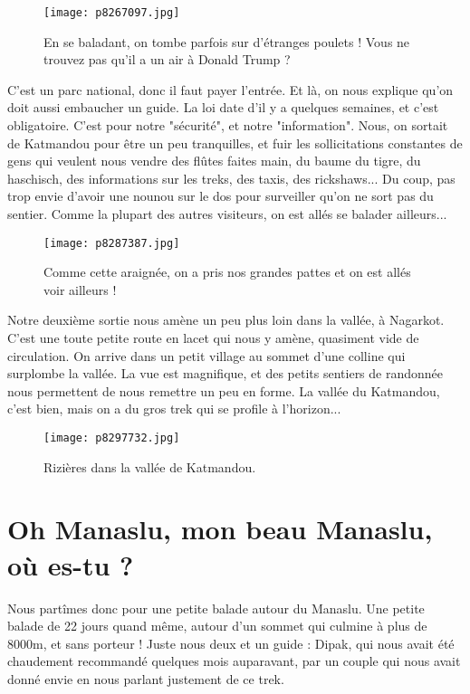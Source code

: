 \documentclass{book}
\begin{document}
\begin{figure}[h]
\centering
\texttt{[image: p8267097.jpg]}
\caption*{En se baladant, on tombe parfois sur d'étranges poulets ! Vous ne trouvez pas qu'il a un air à Donald Trump ?}
\end{figure}

C'est un parc national, donc il faut payer l'entrée. Et là, on nous explique qu'on doit aussi embaucher un guide. La loi date d'il y a quelques semaines, et c'est obligatoire. C'est pour notre "sécurité", et notre "information". Nous, on sortait de Katmandou pour être un peu tranquilles, et fuir les sollicitations constantes de gens qui veulent nous vendre des flûtes faites main, du baume du tigre, du haschisch, des informations sur les treks, des taxis, des rickshaws... Du coup, pas trop envie d'avoir une nounou sur le dos pour surveiller qu'on ne sort pas du sentier. Comme la plupart des autres visiteurs, on est allés se balader ailleurs...


\begin{figure}[h]
\centering
\texttt{[image: p8287387.jpg]}
\caption*{Comme cette araignée, on a pris nos grandes pattes et on est allés voir ailleurs !}
\end{figure}

Notre deuxième sortie nous amène un peu plus loin dans la vallée, à Nagarkot. C'est une toute petite route en lacet qui nous y amène, quasiment vide de circulation. On arrive dans un petit village au sommet d'une colline qui surplombe la vallée. La vue est magnifique, et des petits sentiers de randonnée nous permettent de nous remettre un peu en forme. La vallée du Katmandou, c'est bien, mais on a du gros trek qui se profile à l'horizon...


\begin{figure}[h]
\centering
\texttt{[image: p8297732.jpg]}
\caption*{Rizières dans la vallée de Katmandou.}
\end{figure}



\chapter{Oh Manaslu, mon beau Manaslu, où es-tu ?}
Nous partîmes donc pour une petite balade autour du Manaslu. Une petite balade de 22 jours quand même, autour d'un sommet qui culmine à plus de 8000m, et sans porteur ! Juste nous deux et un guide : Dipak, qui nous avait été chaudement recommandé quelques mois auparavant, par un couple qui nous avait donné envie en nous parlant justement de ce trek.
\end{document}
